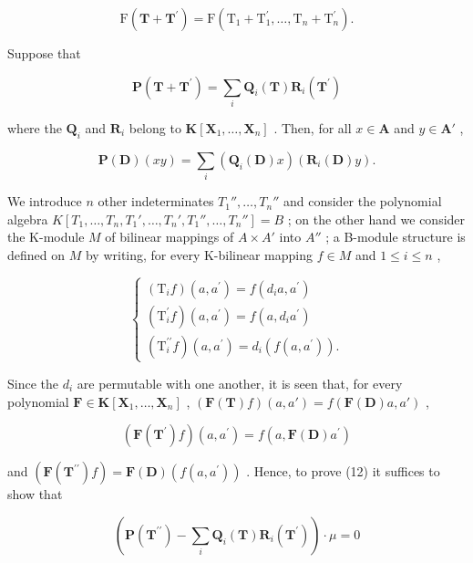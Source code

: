 \[
\mathrm{F} (\mathbf {T} + \mathbf {T} ^ {\prime}) = \mathrm{F} (\mathrm{T} _ {1} + \mathrm{T} _ {1} ^ {\prime}, \dots , \mathrm{T} _ {n} + \mathrm{T} _ {n} ^ {\prime}).
\]

Suppose that

\[
\mathbf {P} (\mathbf {T} + \mathbf {T} ^ {\prime}) = \sum_ {i} \mathbf {Q} _ {i} (\mathbf {T}) \mathbf {R} _ {i} (\mathbf {T} ^ {\prime})
\]

where the \(\mathbf{Q}_i\) and \(\mathbf{R}_i\) belong to \(\mathbf{K}[\mathbf{X}_1,\ldots ,\mathbf{X}_n]\) . Then, for all \(x\in \mathbf{A}\) and \(y\in \mathbf{A}'\) ,

\[
\mathbf {P} (\mathbf {D}) (x y) = \sum_ {i} \left(\mathbf {Q} _ {i} (\mathbf {D}) x\right) (\mathbf {R} _ {i} (\mathbf {D}) y).\tag{12}
\]

We introduce \(n\) other indeterminates \(T_1'', \ldots, T_n''\) and consider the polynomial algebra \(K[T_1, \ldots, T_n, T_1', \ldots, T_n', T_1'', \ldots, T_n''] = B\) ; on the other hand we consider the K-module \(M\) of bilinear mappings of \(A \times A'\) into \(A''\) ; a B-module structure is defined on \(M\) by writing, for every K-bilinear mapping \(f \in M\) and \(1 \leqslant i \leqslant n\) ,

\[
\left\{ \begin{array}{l} (\mathrm{T} _ {i} f) (a, a ^ {\prime}) = f (d _ {i} a, a ^ {\prime}) \\ (\mathrm{T} _ {i} ^ {\prime} f) (a, a ^ {\prime}) = f (a, d _ {i} a ^ {\prime}) \\ (\mathrm{T} _ {i} ^ {\prime \prime} f) (a, a ^ {\prime}) = d _ {i} (f (a, a ^ {\prime})). \end{array} \right.\tag{13}
\]

Since the \(d_{i}\) are permutable with one another, it is seen that, for every polynomial \(\mathbf{F} \in \mathbf{K}[\mathbf{X}_{1}, \ldots, \mathbf{X}_{n}]\) , \((\mathbf{F}(\mathbf{T})f)(a, a') = f(\mathbf{F}(\mathbf{D})a, a')\) ,

\[
(\mathbf {F} (\mathbf {T} ^ {\prime}) f) (a, a ^ {\prime}) = f (a, \mathbf {F} (\mathbf {D}) a ^ {\prime})
\]

and \((\mathbf{F}(\mathbf{T}^{\prime \prime})f) = \mathbf{F}(\mathbf{D})(f(a,a^{\prime}))\) . Hence, to prove (12) it suffices to show that

\[
(\mathbf {P} (\mathbf {T} ^ {\prime \prime}) - \sum_ {i} \mathbf {Q} _ {i} (\mathbf {T}) \mathbf {R} _ {i} (\mathbf {T} ^ {\prime})) \cdot \mu = 0\tag{14}
\]

